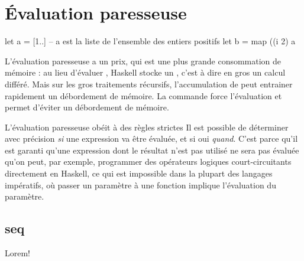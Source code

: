 \section{Évaluation paresseuse}
\label{sec:lazyness}

\begin{haskellcode}
let a = [1..] -- a est la liste de l'ensemble des entiers positifs
let b = map ((^^) 2) a
\end{haskellcode}

L'évaluation paresseuse a un prix, qui est une plus grande consommation de
mémoire : au lieu d'évaluer , Haskell stocke un , c'est
à dire en gros un calcul différé. Mais sur les gros traitements récursifs,
l'accumulation de  peut entrainer rapidement un
débordement de mémoire. La commande  force l'évaluation et permet
d'éviter un débordement de mémoire.

\begin{infobox}{L'évaluation paresseuse obéit à des règles strictes}%
Il est possible de déterminer avec précision \emph{si} une expression va être évaluée, et si oui \emph{quand}. C'est parce qu'il est garanti qu'une expression dont le résultat n'est pas utilisé ne sera pas évaluée qu'on peut, par exemple, programmer des opérateurs logiques court-circuitants directement en Haskell, ce qui est impossible dans la plupart des langages impératifs, où passer un paramètre à une fonction implique l'évaluation du paramètre.
\end{infobox}

\subsection[]{seq}

Lorem!
